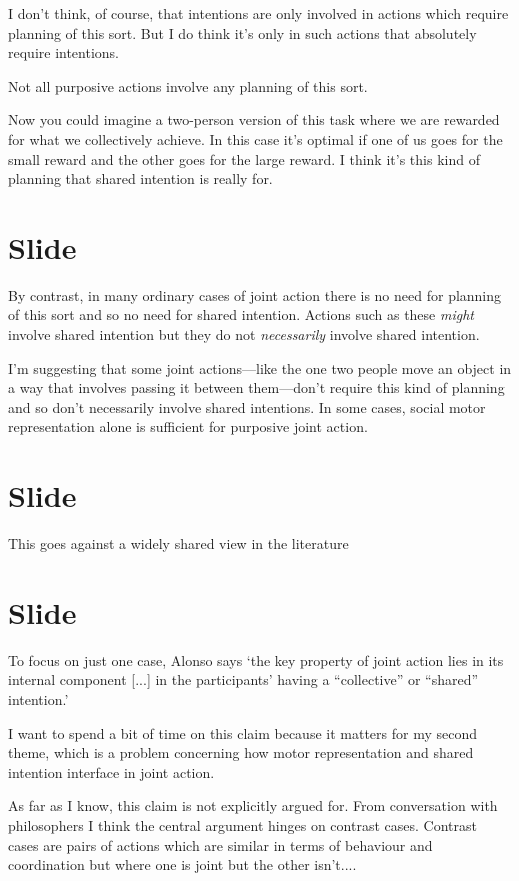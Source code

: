 \documentclass[12pt,\papersize]{extarticle}
\begin{document}
I don't think, of course, that intentions are only involved in actions which require planning of this sort.
But I do think it's only in such actions that absolutely require intentions.

Not all purposive actions involve any planning of this sort. 

Now you could imagine a two-person version of this task where we are rewarded for what we collectively achieve.  In this case it’s optimal if one of us goes for the small reward and the other goes for the large reward.  I think it’s this kind of planning that shared intention is really for.



\section{Slide}
By contrast, in many ordinary cases of joint action there is no need for planning of this sort and so no need for shared intention.  Actions such as these \emph{might} involve shared intention but they do not \emph{necessarily} involve shared intention.

I’m suggesting that some joint actions---like the one two people move an object in a way that involves passing it between them---don’t require this kind of planning and so don’t necessarily involve shared intentions.
In some cases, social motor representation alone is sufficient for purposive joint action.



\section{Slide}
This goes against a widely shared view in the literature



\section{Slide}
To focus on just one case, Alonso says ‘the key property of joint action lies in its internal component [...] in the participants’ having a “collective” or “shared” intention.’ \citep[pp.\ 444-5]{alonso_shared_2009}

I want to spend a bit of time on this claim because it matters for my second theme, which is a problem concerning how motor representation and shared intention interface in joint action.

As far as I know, this claim is not explicitly argued for.  From conversation with philosophers I think the central argument hinges on  contrast cases.
Contrast cases are pairs of actions which are similar in terms of behaviour and coordination but where one is joint but the other isn’t....
\end{document}
